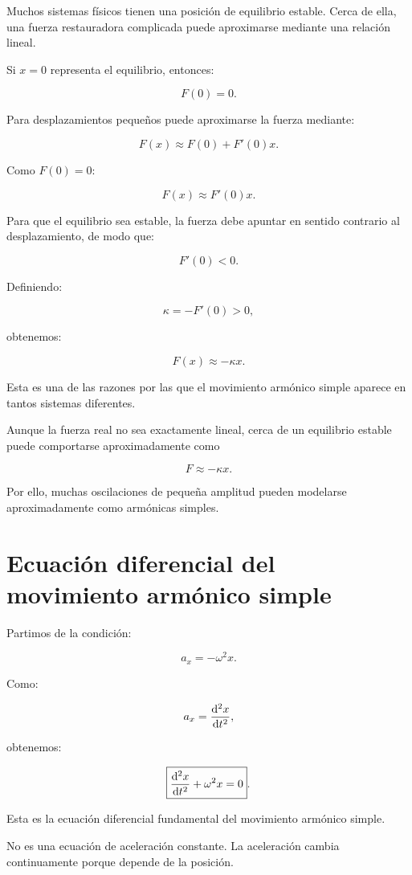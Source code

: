 Muchos sistemas físicos tienen una posición de equilibrio estable. Cerca de ella, una fuerza restauradora complicada puede aproximarse mediante una relación lineal.

Si \(x=0\) representa el equilibrio, entonces:

\[ F(0)=0. \]

Para desplazamientos pequeños puede aproximarse la fuerza mediante:

\[ F(x)\approx F(0)+F'(0)x. \]

Como \(F(0)=0\):

\[ F(x)\approx F'(0)x. \]

Para que el equilibrio sea estable, la fuerza debe apuntar en sentido contrario al desplazamiento, de modo que:

\[ F'(0)<0. \]

Definiendo:

\[ \kappa=-F'(0)>0, \]

obtenemos:

\[ F(x)\approx-\kappa x. \]

\begin{interpretacion}
Esta es una de las razones por las que el movimiento armónico simple aparece en tantos sistemas diferentes.

Aunque la fuerza real no sea exactamente lineal, cerca de un equilibrio estable puede comportarse aproximadamente como

\[ F\approx-\kappa x. \]

Por ello, muchas oscilaciones de pequeña amplitud pueden modelarse aproximadamente como armónicas simples.
\end{interpretacion}

\section{Ecuación diferencial del movimiento armónico simple}

Partimos de la condición:

\[ a_x=-\omega^2x. \]

Como:

\[ a_x=\frac{\mathop{}\!\mathrm{d}^{2}x}{\mathop{}\!\mathrm{d} t^{2}}, \]

obtenemos:

\[ \boxed{\frac{\mathop{}\!\mathrm{d}^{2}x}{\mathop{}\!\mathrm{d} t^{2}}+\omega^2x=0}. \]

Esta es la ecuación diferencial fundamental del movimiento armónico simple.

No es una ecuación de aceleración constante. La aceleración cambia continuamente porque depende de la posición.

